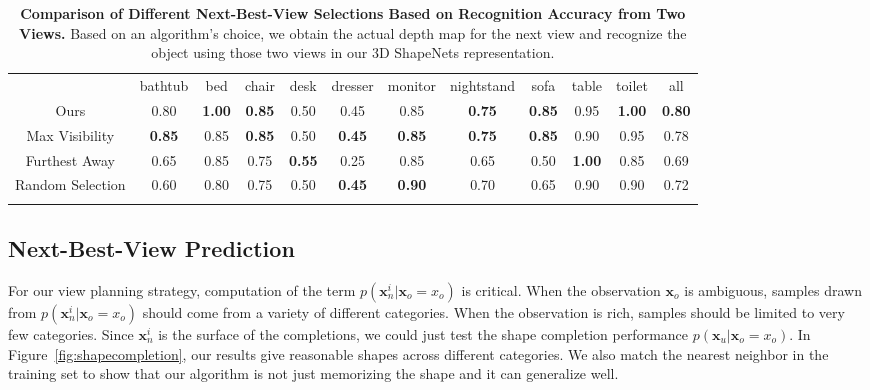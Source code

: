 \documentclass[10pt,twocolumn,letterpaper]{article}
\begin{document}
\begin{table*}[t]
\vspace*{5mm}
\centering
\setlength{\tabcolsep}{9.4pt}
{
\centering
\footnotesize
\begin{tabular}{c|c|c|c|c|c|c|c|c|c|c|c}
\Xhline{2\arrayrulewidth}
 & bathtub & bed & chair & desk & dresser & monitor & \hspace{-1mm}nightstand\hspace{-1mm}  & \hspace{1mm}sofa\hspace{1mm} & table & toilet & all\tabularnewline
\Xhline{2\arrayrulewidth}
Ours & 0.80 & {\bf 1.00} & {\bf 0.85} & 0.50 & {\bf }0.45 & 0.85 & {\bf 0.75}   & {\bf 0.85} & 0.95 & {\bf 1.00} & {\bf 0.80}\tabularnewline
\hline 
Max Visibility & {\bf 0.85}  &  0.85  & {\bf  0.85} & 0.50 & {\bf 0.45} & {\bf 0.85} & {\bf 0.75} & {\bf 0.85} & 0.90 &  0.95  & 0.78\tabularnewline
\hline 
Furthest Away & 0.65 &  0.85  & 0.75 & {\bf 0.55} & 0.25 & 0.85  &  0.65 & 0.50 & {\bf 1.00} &  0.85 & 0.69\tabularnewline
\hline 
Random Selection & 0.60  &  0.80  & 0.75 & 0.50 & {\bf 0.45} & {\bf 0.90} & 0.70 & 0.65 & 0.90  & 0.90 & 0.72\tabularnewline
\Xhline{2\arrayrulewidth}
\end{tabular}
}
\vspace*{-2mm}
\caption{{\bf Comparison of Different Next-Best-View Selections Based on Recognition Accuracy from Two Views.}
Based on an algorithm's choice, we obtain the actual depth map for the next view and recognize 
the object using those two views in our 3D ShapeNets representation.
}
\label{table:nbv}
\end{table*}

\subsection{Next-Best-View Prediction}








For our view planning strategy, computation of the term $p(\mathbf{x}_n^i|\mathbf{x}_o=x_o)$ is critical. When the observation $\mathbf{x}_o$ is ambiguous, samples drawn from $p(\mathbf{x}_n^i|\mathbf{x}_o=x_o)$ should come from a variety of different categories. When the observation is rich, samples should be limited to very few categories. Since $\mathbf{x}_n^i$ is the surface of the completions, we could just test the shape completion performance $p(\mathbf{x}_u|\mathbf{x}_o=x_o)$. In Figure~\ref{fig:shapecompletion}, our results give reasonable shapes across different categories. 
We also match the nearest neighbor in the training set to show that our algorithm is not just memorizing the shape and it can generalize well.
\end{document}
